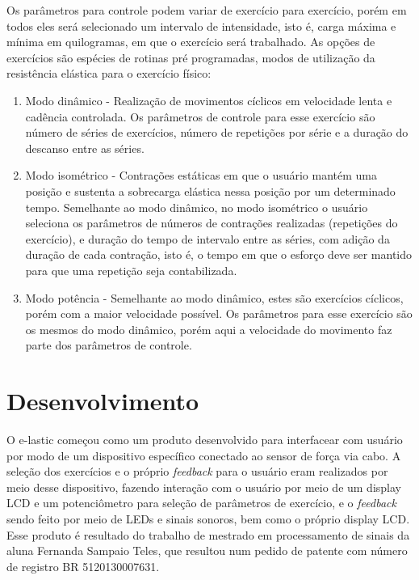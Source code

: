 Os parâmetros para controle podem variar de exercício para exercício, porém em todos eles será selecionado um intervalo de intensidade, isto é, carga máxima e mínima em quilogramas, em que o exercício será trabalhado. As opções de exercícios são espécies de rotinas pré programadas, modos de utilização da resistência elástica para o exercício físico:

\begin{enumerate}
\item Modo dinâmico - Realização de movimentos cíclicos em velocidade lenta e cadência controlada. Os parâmetros de controle para esse exercício são número de séries de exercícios, número de repetições por série e a duração do descanso entre as séries.
\item Modo isométrico - Contrações estáticas em que o usuário mantém uma posição e sustenta a sobrecarga elástica nessa posição por um determinado tempo. Semelhante ao modo dinâmico, no modo isométrico o usuário seleciona os parâmetros de números de contrações realizadas (repetições do exercício), e duração do tempo de intervalo entre as séries, com adição da duração de cada contração, isto é, o tempo em que o esforço deve ser mantido para que uma repetição seja contabilizada.
\item Modo potência - Semelhante ao modo dinâmico, estes são exercícios cíclicos, porém com a maior velocidade possível. Os parâmetros para esse exercício são os mesmos do modo dinâmico, porém aqui a velocidade do movimento faz parte dos parâmetros de controle.
\end{enumerate}

\section{Desenvolvimento}

O e-lastic começou como um produto desenvolvido para interfacear com usuário por modo de um dispositivo específico conectado ao sensor de força via cabo. A seleção dos exercícios e o próprio \textit{feedback} para o usuário eram realizados por meio desse dispositivo, fazendo interação com o usuário por meio de um display LCD e um potenciômetro para seleção de parâmetros de exercício, e o \textit{feedback} sendo feito por meio de LEDs e sinais sonoros, bem como o próprio display LCD. Esse produto é resultado do trabalho de mestrado em processamento de sinais da aluna Fernanda Sampaio Teles, que resultou num pedido de patente com número de registro BR 5120130007631.

